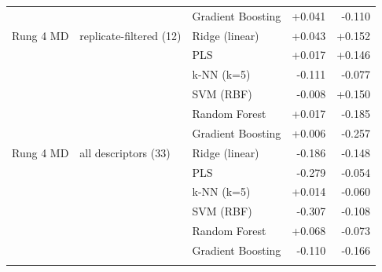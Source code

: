 \begin{tabular}{lllrr}
 &  & Gradient Boosting & +0.041 & -0.110 \\
\addlinespace
Rung 4 MD & replicate-filtered (12) & Ridge (linear) & +0.043 & +0.152 \\
 &  & PLS & +0.017 & +0.146 \\
 &  & k-NN (k=5) & -0.111 & -0.077 \\
 &  & SVM (RBF) & -0.008 & +0.150 \\
 &  & Random Forest & +0.017 & -0.185 \\
 &  & Gradient Boosting & +0.006 & -0.257 \\
\addlinespace
Rung 4 MD & all descriptors (33) & Ridge (linear) & -0.186 & -0.148 \\
 &  & PLS & -0.279 & -0.054 \\
 &  & k-NN (k=5) & +0.014 & -0.060 \\
 &  & SVM (RBF) & -0.307 & -0.108 \\
 &  & Random Forest & +0.068 & -0.073 \\
 &  & Gradient Boosting & -0.110 & -0.166 \\
\addlinespace
\bottomrule
\end{tabular}
